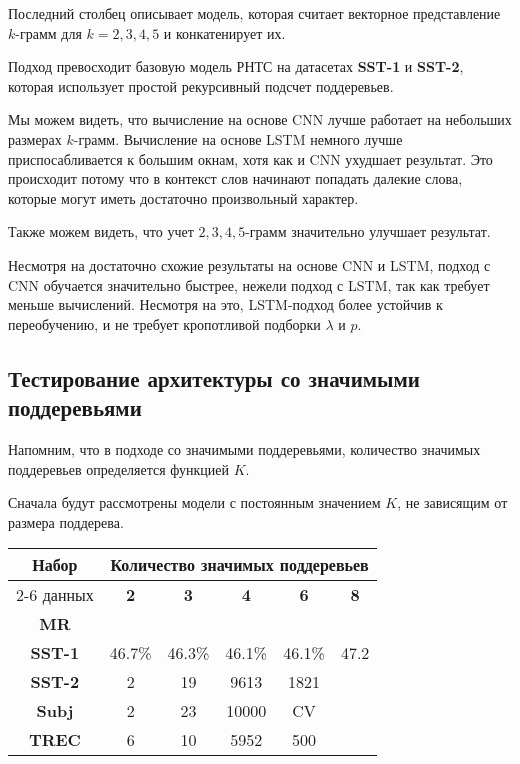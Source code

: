
Последний столбец описывает модель, которая считает векторное представление $k$-грамм для $k=2,3,4,5$ и конкатенирует их.

Подход превосходит базовую модель РНТС на датасетах \textbf{SST-1} и \textbf{SST-2}, 
которая использует простой рекурсивный подсчет поддеревьев.

Мы можем видеть, что вычисление на основе CNN лучше работает на небольших размерах $k$-грамм.
Вычисление на основе LSTM немного лучше приспосабливается к большим окнам, хотя как и CNN ухудшает результат.
Это происходит потому что в контекст слов начинают попадать далекие слова, 
которые могут иметь достаточно произвольный характер.

Также можем видеть, что учет $2,3,4,5$-грамм значительно улучшает результат.

Несмотря на достаточно схожие результаты на основе CNN и LSTM, 
подход с CNN обучается значительно быстрее, нежели подход с LSTM, так как требует меньше вычислений.
Несмотря на это, LSTM-подход более устойчив к переобучению, и не требует кропотливой подборки $\lambda$ и $p$.


\subsection{Тестирование архитектуры со значимыми поддеревьями}

Напомним, что в подходе со значимыми поддеревьями, количество значимых поддеревьев определяется функцией $K$.

Сначала будут рассмотрены модели с постоянным значением $K$, не зависящим от размера поддерева.

\vspace{5mm}
\noindent \begin{minipage}{\linewidth}
 \label{tab:title} 
\begin{tabular}{|c|c|c|c|c|c|}
\hline
\multirow{2}{*}{Набор}   &                \multicolumn{5}{c|}{Количество значимых поддеревьев} \\ \cline{2-6} 
     данных              &   \textbf{2} & \textbf{3} & \textbf{4} & \textbf{6} & \textbf{8} \\ \hline
\textbf{MR}              &              &            &            &            &  \\ \hline
\textbf{SST-1}           & 46.7\%       & 46.3\%     &  46.1\%    &  46.1\%    &  47.2  \\ \hline
\textbf{SST-2}           & 2            & 19         &  9613      &  1821      & \\ \hline
\textbf{Subj}            & 2            & 23         &  10000     &  CV        & \\ \hline
\textbf{TREC}            & 6            & 10         &  5952      &  500       & \\ \hline
\end{tabular}
\end{minipage}
\vspace{5mm}

